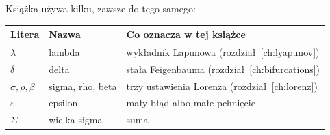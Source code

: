 \noindent
Książka używa kilku, zawsze do tego samego:

\begin{center}
\begin{tabular}{lll}
\toprule
Litera & Nazwa & Co oznacza w tej książce \\
\midrule
$\lambda$ & lambda & wykładnik Lapunowa (rozdział~\ref{ch:lyapunov}) \\
$\delta$ & delta & stała Feigenbauma (rozdział~\ref{ch:bifurcations}) \\
$\sigma, \rho, \beta$ & sigma, rho, beta & trzy ustawienia Lorenza (rozdział~\ref{ch:lorenz}) \\
$\varepsilon$ & epsilon & mały błąd albo małe pchnięcie \\
$\Sigma$ & wielka sigma & suma \\
\bottomrule
\end{tabular}
\end{center}
